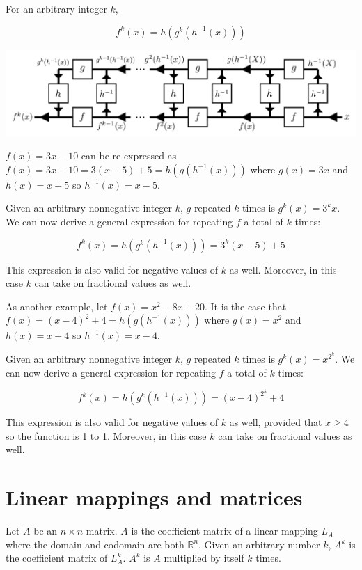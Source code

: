\documentclass{article}
\begin{document}
For an arbitrary integer \(k\), 

\[f^k(x) = h(g^k(h^{-1}(x)))\]

\includegraphics[width = \textwidth]{repeating_function}

\(f(x) = 3x - 10\) can be re-expressed as \(f(x) = 3x - 10 = 3(x - 5) + 5 = h(g(h^{-1}(x)))\) where \(g(x) = 3x\) and \(h(x) = x + 5\) so \(h^{-1}(x) = x - 5\).

Given an arbitrary nonnegative integer \(k\), \(g\) repeated \(k\) times is \(g^k(x) = 3^k x\). We can now derive a general expression for repeating \(f\) a total of \(k\) times:

\[f^k(x) = h(g^k(h^{-1}(x))) = 3^k(x - 5) + 5\]

This expression is also valid for negative values of \(k\) as well. Moreover, in this case \(k\) can take on fractional values as well.


\vspace{5mm}

As another example, let \(f(x) = x^2 - 8x + 20\). It is the case that \(f(x) = (x - 4)^2 + 4 = h(g(h^{-1}(x)))\) where \(g(x) = x^2\) and \(h(x) = x + 4\) so \(h^{-1}(x) = x - 4\).

Given an arbitrary nonnegative integer \(k\), \(g\) repeated \(k\) times is \(g^k(x) = x^{2^k}\). We can now derive a general expression for repeating \(f\) a total of \(k\) times:

\[f^k(x) = h(g^k(h^{-1}(x))) = (x - 4)^{2^k} + 4\]

This expression is also valid for negative values of \(k\) as well, provided that \(x \geq 4\) so the function is 1 to 1. Moreover, in this case \(k\) can take on fractional values as well.




\section*{Linear mappings and matrices}

Let \(A\) be an \(n \times n\) matrix. \(A\) is the coefficient matrix of a linear mapping \(L_A\) where the domain and codomain are both \(\mathbb{R}^n\). Given an arbitrary number \(k\), \(A^k\) is the coefficient matrix of \(L_A^k\). \(A^k\) is \(A\) multiplied by itself \(k\) times.
\end{document}
